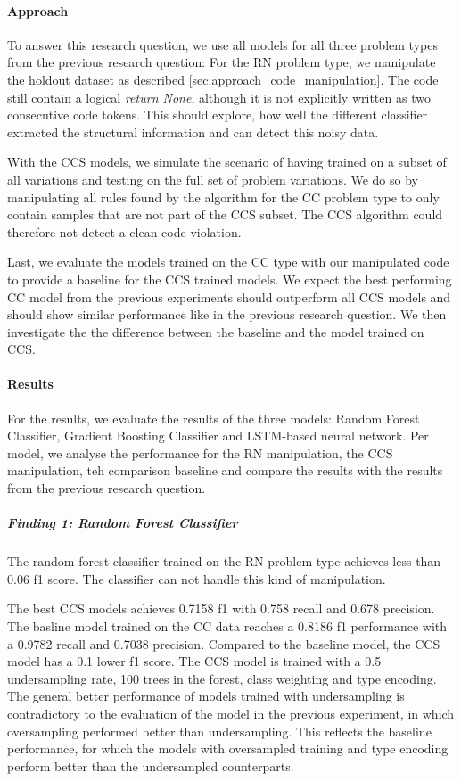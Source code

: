 \paragraph{Approach}
To answer this research question, we use all models for all three problem types from the previous research question: For the RN problem type, we manipulate the holdout dataset as described \ref{sec:approach_code_manipulation}. The code still contain a logical \textit{return None}, although it is not explicitly written as two consecutive code tokens. This should explore, how well the different classifier extracted the structural information and can detect this noisy data. 

With the CCS models, we simulate the scenario of having trained on a subset of all variations and testing on the full set of problem variations. We do so by manipulating all rules found by the algorithm for the CC problem type to only contain samples that are not part of the CCS subset. The CCS algorithm could therefore not detect a clean code violation.

Last, we evaluate the models trained on the CC type with our manipulated code to provide a baseline for the CCS trained models. We expect the best performing CC model from the previous experiments should outperform all CCS models and should show similar performance like in the previous research question. We then investigate the the difference between the baseline and the model trained on CCS.

\paragraph{Results}
For the results, we evaluate the results of the three models: Random Forest Classifier, Gradient Boosting Classifier and LSTM-based neural network. Per model, we analyse the performance for the RN manipulation, the CCS manipulation, teh comparison baseline and compare the results with the results from the previous research question.


\subparagraph{Finding 1: Random Forest Classifier}
The random forest classifier trained on the RN problem type achieves less than 0.06 f1 score. The classifier can not handle this kind of manipulation.

The best CCS models achieves 0.7158 f1 with 0.758 recall and 0.678 precision. The basline model trained on the CC data reaches a 0.8186 f1 performance with a 0.9782 recall and 0.7038 precision. Compared to the baseline model, the CCS model has a 0.1 lower f1 score. The CCS model is trained with a 0.5 undersampling rate, 100 trees in the forest, class weighting and type encoding. The general better performance of models trained with undersampling is contradictory to the evaluation of the model in the previous experiment, in which oversampling performed better than undersampling. This reflects the baseline performance, for which the models with oversampled training and type encoding perform better than the undersampled counterparts. 

